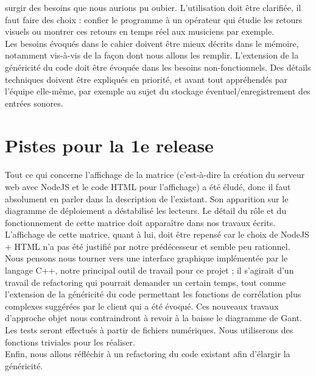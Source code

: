 \documentclass[a4paper]{article}
\begin{document}
surgir des besoins que nous aurions pu oubier. L'utilisation doit être clarifiée, il
faut faire des choix : confier le programme à un opérateur qui étudie les retours
visuels ou montrer ces retours en temps réel aux musiciens par exemple. \\
Les besoins évoqués dans le cahier doivent être mieux décrits dans le mémoire,
notamment vis-à-vis de la façon dont nous allons les remplir. L'extension de la 
généricité du code doit être évoquée dans les besoins non-fonctionnels. Des détails
techniques doivent être expliqués en priorité, et avant tout appréhendés par l'équipe
elle-même, par exemple au sujet du stockage éventuel/enregistrement des entrées sonores.


\section*{Pistes pour la 1e release}
\paragraph{}
Tout ce qui concerne l'affichage de la matrice (c'est-à-dire la création du
serveur web avec NodeJS et le code HTML pour l'affichage) a été éludé, donc il
faut absolument en parler dans la description de l'existant. Son apparition sur
le diagramme de déploiement a déstabilisé les lecteurs. Le détail du rôle et du
fonctionnement de cette matrice doit apparaître dans nos travaux écrits. \\
L'affichage de cette matrice, quant à lui, doit être repensé car le choix de 
NodeJS + HTML n'a pas été justifié par notre prédécesseur et semble peu rationnel.
Nous pensons nous tourner vers une interface graphique implémentée par le langage
C++, notre principal outil de travail pour ce projet ; il s'agirait d'un travail de
refactoring qui pourrait demander un certain temps, tout comme l'extension de la
généricité du code permettant les fonctions de corrélation plus complexes suggérées par
le client qui a été évoqué. Ces nouveaux travaux d'approche objet nous contraindront à
revoir à la baisse le diagramme de Gant. \\
Les tests seront effectués à partir de fichiers numériques. Nous utiliserons des
fonctions triviales pour les réaliser. \\
Enfin, nous allons réfléchir à un refactoring du code existant afin d'élargir
la généricité.
\end{document}
